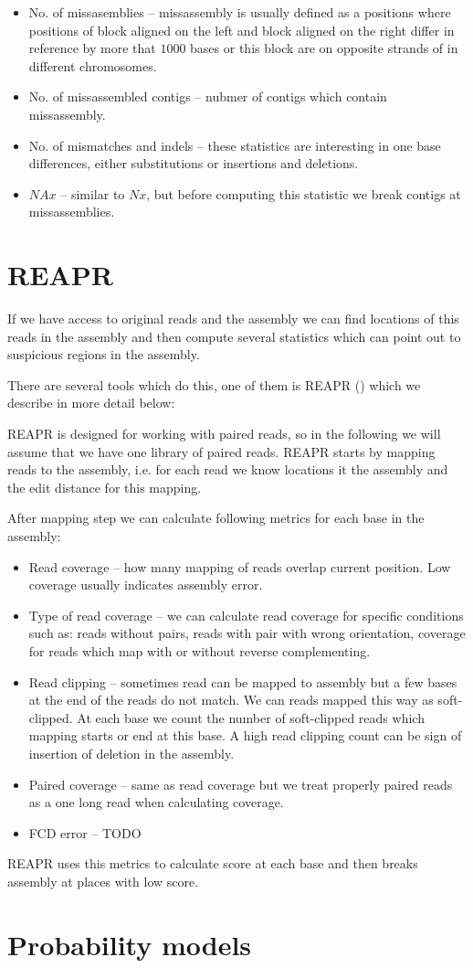 \begin{itemize}
\item No. of missasemblies -- missassembly is usually defined as a positions where
positions of block aligned on the left and block aligned on the right differ in reference
by more that $1000$ bases or this block are on opposite strands of in different chromosomes.
\item No. of missassembled contigs -- nubmer of contigs which contain missassembly.
\item No. of mismatches and indels -- these statistics are interesting in one base differences,
either substitutions or insertions and deletions.
\item $NAx$ -- similar to $Nx$, but before computing this statistic we break
contigs at missassemblies.
\end{itemize}

\section{REAPR}

If we have access to original reads and the assembly we can find locations
of this reads in the assembly and then compute several statistics which
can point out to suspicious regions in the assembly.

There are several tools which do this, one of them is REAPR (\cite{Reapr}) which we describe
in more detail below:

REAPR is designed for working with paired reads, so in the following we will assume that
we have one library of paired reads. REAPR starts by mapping reads to the assembly, i.e. for each read we know locations it the assembly
and the edit distance for this mapping.

After mapping step we can calculate following metrics for each base in the assembly:
\begin{itemize}
\item Read coverage -- how many mapping of reads overlap current position. Low coverage usually indicates assembly error.
\item Type of read coverage -- we can calculate read coverage for specific conditions such as: reads without pairs, reads with pair with wrong orientation,
coverage for reads which map with or without reverse complementing.
\item Read clipping -- sometimes read can be mapped to assembly but a few bases at the end of the reads do not match. We can reads mapped this way as soft-clipped.
At each base we count the number of soft-clipped reads which mapping starts or end at this base. A high read clipping count can be sign of insertion of deletion
in the assembly.
\item Paired coverage -- same as read coverage but we treat properly paired reads as a one long read when calculating coverage.
\item FCD error -- TODO
\end{itemize}

REAPR uses this metrics to calculate score at each base and then breaks assembly at places with low score.

\section{Probability models}

